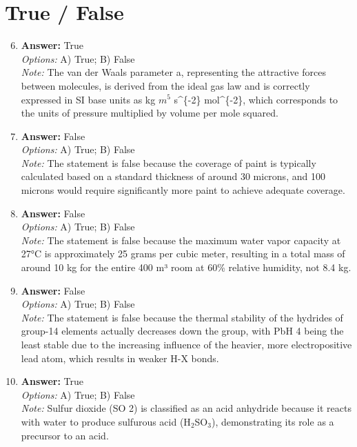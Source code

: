 \documentclass[12pt]{article}
\begin{document}
\section*{True / False}
\begin{enumerate}[label=\arabic*.]
\setcounter{enumi}{5}
\item \textbf{Answer:} True
\\ \textit{Options:} A) True; B) False
\\ \textit{Note:} The van der Waals parameter a, representing the attractive forces between molecules, is derived from the ideal gas law and is correctly expressed in SI base units as kg $m^5$ s^\{-2\} mol^\{-2\}, which corresponds to the units of pressure multiplied by volume per mole squared.
\item \textbf{Answer:} False
\\ \textit{Options:} A) True; B) False
\\ \textit{Note:} The statement is false because the coverage of paint is typically calculated based on a standard thickness of around 30 microns, and 100 microns would require significantly more paint to achieve adequate coverage.
\item \textbf{Answer:} False
\\ \textit{Options:} A) True; B) False
\\ \textit{Note:} The statement is false because the maximum water vapor capacity at 27°C is approximately 25 grams per cubic meter, resulting in a total mass of around 10 kg for the entire 400 m³ room at 60\% relative humidity, not 8.4 kg.
\item \textbf{Answer:} False
\\ \textit{Options:} A) True; B) False
\\ \textit{Note:} The statement is false because the thermal stability of the hydrides of group-14 elements actually decreases down the group, with PbH 4 being the least stable due to the increasing influence of the heavier, more electropositive lead atom, which results in weaker H-X bonds.
\item \textbf{Answer:} True
\\ \textit{Options:} A) True; B) False
\\ \textit{Note:} Sulfur dioxide (SO 2) is classified as an acid anhydride because it reacts with water to produce sulfurous acid (H$_{2}$SO$_{3}$), demonstrating its role as a precursor to an acid.
\end{enumerate}
\end{document}
